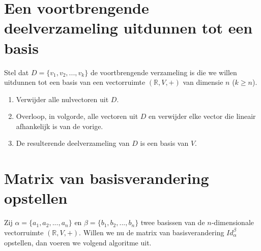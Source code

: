 \documentclass[lineaire_algebra_oplossingen.tex]{subfiles}
\begin{document}
\section{Een voortbrengende deelverzameling uitdunnen tot een basis}
Stel dat $D = \{v_1,v_2,...,v_k\}$ de voortbrengende verzameling is die we willen uitdunnen tot een basis van een vectorruimte $(\mathbb{R},V,+)$ van dimensie $n$ ($k\ge n$).
\begin{enumerate}
\item Verwijder alle nulvectoren uit $D$.
\item Overloop, in volgorde, alle vectoren uit $D$ en verwijder elke vector die lineair afhankelijk is van de vorige.
\item De resulterende deelverzameling van $D$ is een basis van $V$.
\end{enumerate}

\section{Matrix van basisverandering opstellen}
Zij $\alpha = \{a_1,a_2,...,a_n\}$ en $\beta = \{b_1,b_2,...,b_n\}$ twee basissen van de $n$-dimensionale vectorruimte $(\mathbb{R},V,+)$. Willen we nu de matrix van basisverandering $Id_\alpha^\beta$ opstellen, dan voeren we volgend algoritme uit.
\end{document}

